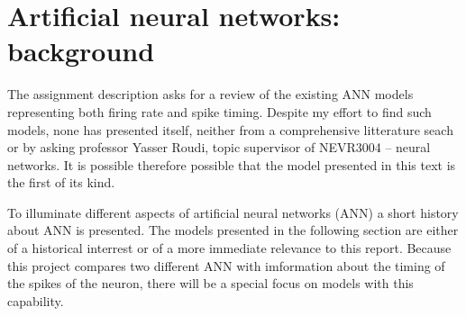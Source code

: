 % 			
% 			
% 			
% 			
% 			
%
%
%
%
%
%
%
\section{Artificial neural networks: background}

The assignment description asks for a review of the existing ANN models representing both firing rate and spike timing.
Despite my effort to find such models, none has presented itself, neither from a comprehensive litterature seach or by asking professor Yasser Roudi, topic supervisor of NEVR3004 -- neural networks.
It is possible therefore possible that the model presented in this text is the first of its kind.

To illuminate different aspects of artificial neural networks (ANN) a short history about ANN is presented. 
The models presented in the following section are either of a historical interrest or of a more immediate relevance to this report.
Because this project compares two different ANN with imformation about the timing of the spikes of the neuron, there will be a special focus on models with this capability. %
%



